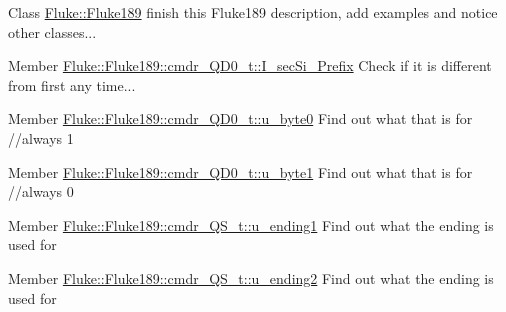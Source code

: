 \label{todo__todo000002}
\hypertarget{todo__todo000002}{}
 
\begin{DoxyDescription}
\item[Class \hyperlink{classFluke_1_1Fluke189}{Fluke::Fluke189} ]finish this Fluke189 description, add examples and notice other classes...


\end{DoxyDescription}

\label{todo__todo000015}
\hypertarget{todo__todo000015}{}
 
\begin{DoxyDescription}
\item[Member \hyperlink{structFluke_1_1Fluke189_1_1cmdr__QD0__t_a3bc502dcc711f5c308028b588e57e226}{Fluke::Fluke189::cmdr\_\-QD0\_\-t::I\_\-secSi\_\-Prefix} ]Check if it is different from first any time... 
\end{DoxyDescription}

\label{todo__todo000016}
\hypertarget{todo__todo000016}{}
 
\begin{DoxyDescription}
\item[Member \hyperlink{structFluke_1_1Fluke189_1_1cmdr__QD0__t_a8255c6d6c66768208d4a020146369013}{Fluke::Fluke189::cmdr\_\-QD0\_\-t::u\_\-byte0} ]Find out what that is for //always 1 
\end{DoxyDescription}

\label{todo__todo000017}
\hypertarget{todo__todo000017}{}
 
\begin{DoxyDescription}
\item[Member \hyperlink{structFluke_1_1Fluke189_1_1cmdr__QD0__t_a835768e5aabd53d41e1e7a4d10fdde1f}{Fluke::Fluke189::cmdr\_\-QD0\_\-t::u\_\-byte1} ]Find out what that is for //always 0 
\end{DoxyDescription}

\label{todo__todo000007}
\hypertarget{todo__todo000007}{}
 
\begin{DoxyDescription}
\item[Member \hyperlink{structFluke_1_1Fluke189_1_1cmdr__QS__t_ae5e99fd781866c32cdba484e15276d7a}{Fluke::Fluke189::cmdr\_\-QS\_\-t::u\_\-ending1} ]Find out what the ending is used for 
\end{DoxyDescription}

\label{todo__todo000008}
\hypertarget{todo__todo000008}{}
 
\begin{DoxyDescription}
\item[Member \hyperlink{structFluke_1_1Fluke189_1_1cmdr__QS__t_a08dec92163b6c7a734cdf4aa185d0875}{Fluke::Fluke189::cmdr\_\-QS\_\-t::u\_\-ending2} ]Find out what the ending is used for 
\end{DoxyDescription}

